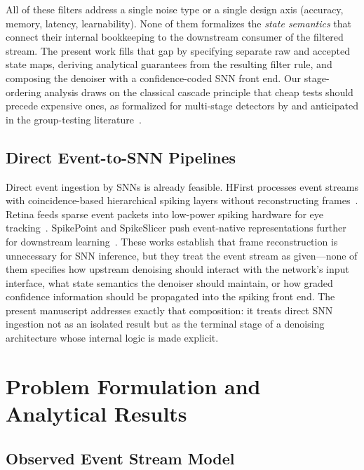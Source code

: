 \documentclass[a4paper,fleqn]{cas-dc}
\begin{document}
All of these filters address a single noise type or a single design axis (accuracy, memory, latency, learnability). None of them formalizes the \emph{state semantics} that connect their internal bookkeeping to the downstream consumer of the filtered stream. The present work fills that gap by specifying separate raw and accepted state maps, deriving analytical guarantees from the resulting filter rule, and composing the denoiser with a confidence-coded SNN front end. Our stage-ordering analysis draws on the classical cascade principle that cheap tests should precede expensive ones, as formalized for multi-stage detectors by \citet{viola2001rapid} and anticipated in the group-testing literature~\citep{dorfman1943detection}.

\subsection{Direct Event-to-SNN Pipelines}
\label{sec:related_snn}

Direct event ingestion by SNNs is already feasible. HFirst processes event streams with coincidence-based hierarchical spiking layers without reconstructing frames~\citep{orchard2015hfirst}. Retina feeds sparse event packets into low-power spiking hardware for eye tracking~\citep{bonazzi2024retina}. SpikePoint and SpikeSlicer push event-native representations further for downstream learning~\citep{ren2024spikepoint,spikeslicer2024}. These works establish that frame reconstruction is unnecessary for SNN inference, but they treat the event stream as given---none of them specifies how upstream denoising should interact with the network's input interface, what state semantics the denoiser should maintain, or how graded confidence information should be propagated into the spiking front end. The present manuscript addresses exactly that composition: it treats direct SNN ingestion not as an isolated result but as the terminal stage of a denoising architecture whose internal logic is made explicit.

\section{Problem Formulation and Analytical Results}
\label{sec:problem}

\subsection{Observed Event Stream Model}
\label{sec:problem_model}
\end{document}
